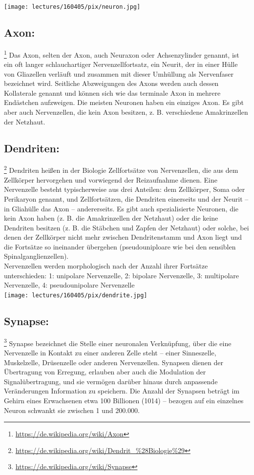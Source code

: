 \texttt{[image: lectures/160405/pix/neuron.jpg]}

\subsection{Axon:}\footnote{\url{https://de.wikipedia.org/wiki/Axon}} Das Axon, selten der Axon, auch Neuraxon oder Achsenzylinder genannt, ist ein oft langer schlauchartiger Nervenzellfortsatz, ein Neurit, der in einer Hülle von Gliazellen verläuft und zusammen mit dieser Umhüllung als Nervenfaser bezeichnet wird. Seitliche Abzweigungen des Axons werden auch dessen Kollaterale genannt und können sich wie das terminale Axon in mehrere Endästchen aufzweigen. Die meisten Neuronen haben ein einziges Axon. Es gibt aber auch Nervenzellen, die kein Axon besitzen, z. B. verschiedene Amakrinzellen der Netzhaut.

\subsection{Dendriten:}\footnote{\url{https://de.wikipedia.org/wiki/Dendrit_\%28Biologie\%29}} Dendriten heißen in der Biologie Zellfortsätze von Nervenzellen, die aus dem Zellkörper hervorgehen und vorwiegend der Reizaufnahme dienen. Eine Nervenzelle besteht typischerweise aus drei Anteilen: dem Zellkörper, Soma oder Perikaryon genannt, und Zellfortsätzen, die Dendriten einerseits und der Neurit – in Gliahülle das Axon – andererseits. Es gibt auch spezialisierte Neuronen, die kein Axon haben (z. B. die Amakrinzellen der Netzhaut) oder die keine Dendriten besitzen (z. B. die Stäbchen und Zapfen der Netzhaut) oder solche, bei denen der Zellkörper nicht mehr zwischen Dendritenstamm und Axon liegt und die Fortsätze so ineinander übergehen (pseudouniploare wie bei den sensiblen Spinalganglienzellen).
\\
Nervenzellen werden morphologisch nach der Anzahl ihrer Fortsätze unterschieden:
1: unipolare Nervenzelle, 2: bipolare Nervenzelle, 3: multipolare Nervenzelle, 4: pseudounipolare Nervenzelle\\
\texttt{[image: lectures/160405/pix/dendrite.jpg]}

\subsection{Synapse:}\footnote{\url{https://de.wikipedia.org/wiki/Synapse}} Synapse bezeichnet die Stelle einer neuronalen Verknüpfung, über die eine Nervenzelle in Kontakt zu einer anderen Zelle steht – einer Sinneszelle, Muskelzelle, Drüsenzelle oder anderen Nervenzellen. Synapsen dienen der Übertragung von Erregung, erlauben aber auch die Modulation der Signalübertragung, und sie vermögen darüber hinaus durch anpassende Veränderungen Information zu speichern. Die Anzahl der Synapsen beträgt im Gehirn eines Erwachsenen etwa 100 Billionen (1014) – bezogen auf ein einzelnes Neuron schwankt sie zwischen 1 und 200.000.

